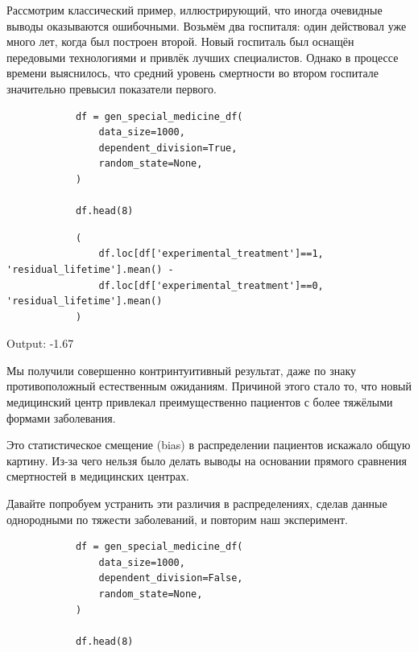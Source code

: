         Рассмотрим классический пример, иллюстрирующий, что иногда очевидные выводы оказываются ошибочными.
        Возьмём два госпиталя: один действовал уже много лет, когда был построен второй.
        Новый госпиталь был оснащён передовыми технологиями и привлёк лучших специалистов.
        Однако в процессе времени выяснилось, что средний уровень смертности во втором госпитале значительно превысил показатели первого.


        \begin{verbatim}
            df = gen_special_medicine_df(
                data_size=1000,
                dependent_division=True,
                random_state=None,
            )

            df.head(8)
        \end{verbatim}

        

        \begin{verbatim}
            (
                df.loc[df['experimental_treatment']==1, 'residual_lifetime'].mean() -
                df.loc[df['experimental_treatment']==0, 'residual_lifetime'].mean()
            )
        \end{verbatim}

        Output: -1.67

        Мы получили совершенно контринтуитивный результат, даже по знаку противоположный естественным ожиданиям.
        Причиной этого стало то, что новый медицинский центр привлекал преимущественно пациентов с более тяжёлыми формами заболевания.

        Это статистическое смещение (bias) в распределении пациентов искажало общую картину.
        Из-за чего нельзя было делать выводы на основании прямого сравнения смертностей в медицинских центрах.

        Давайте попробуем устранить эти различия в распределениях, сделав данные однородными по тяжести заболеваний, и повторим наш эксперимент.


        \begin{verbatim}
            df = gen_special_medicine_df(
                data_size=1000,
                dependent_division=False,
                random_state=None,
            )

            df.head(8)
        \end{verbatim}

